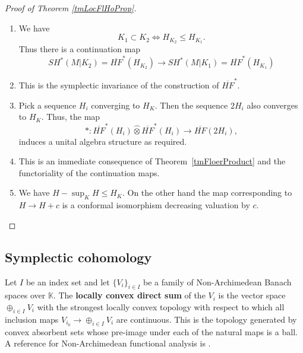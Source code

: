 \documentclass[11pt]{amsart}
\newcommand{\K}{\mathbb{K}}
\theoremstyle{definition}
\theoremstyle{remark}
\begin{document}
\begin{proof}[Proof of Theorem \ref{tmLocFlHoProp}]
\begin{enumerate}[wide, labelwidth=!, labelindent=0pt]
\item We have
    \[
    K_1\subset K_2\iff H_{K_2}\leq H_{K_1}.
    \]
    Thus there is a continuation map
    \[
    SH^*(M|K_2)=\overline{HF}^*(H_{K_2})\to SH^*(M|K_1)=\overline{HF}^*(H_{K_1})
    \]
\item
    This is the symplectic invariance of the construction of $\overline{HF}^*$.
\item Pick a sequence $H_i$ converging to $H_K$. Then the sequence $2H_i$ also converges to $H_K$. Thus, the map
    \begin{equation}\label{eqLocComTri}
    *:\overline{HF}^*(H_i)\hat{\otimes}\overline{HF}^*(H_i)\to \overline{HF}(2H_i),
    \end{equation}
    induces a unital algebra structure as required.
\item This is an immediate consequence of Theorem~\ref{tmFloerProduct} and the functoriality of the continuation maps.
\item We have $H-\sup_KH\leq H_K$. On the other hand the map corresponding to $H\to H+c$ is a conformal isomorphism decreasing valuation by $c$.
\end{enumerate}

\end{proof}
\subsection{Symplectic cohomology}\label{SecSHuniv}
Let $I$ be an index set and let $\{V_i\}_{i\in I}$ be a family of Non-Archimedean Banach spaces over $\K$. The \textbf{locally convex direct sum} of the $V_i$ is the vector space $\oplus_{i\in I}V_i$ with the strongest locally convex topology with respect to which all inclusion maps $V_{i_0}\to \oplus_{i\in I}V_i$ are continuous. This is the topology generated by convex absorbent sets whose pre-image under each of the natural maps is a ball. A reference for Non-Archimedean functional analysis is \cite{Schneider02}.
\end{document}
